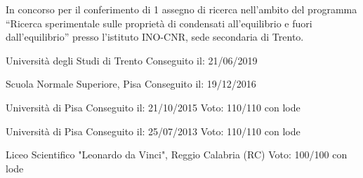 \documentclass[helvetica,italian,logo,notitle,totpages,utf8]{europecv2013}
\begin{document}

\begin{europecv}



\ecvpersonalinfo[10pt]

{In concorso per il conferimento di 1 assegno di ricerca nell'ambito del programma “Ricerca sperimentale sulle proprietà di condensati all'equilibrio e fuori dall'equilibrio” presso l'istituto INO-CNR, sede secondaria di Trento.}


{Università degli Studi di Trento}%
{Conseguito il: 21/06/2019 \vspace{-1.5em}}%
{}%

{Scuola Normale Superiore, Pisa}%
{Conseguito il: 19/12/2016 \vspace{-1.5em}}%
{}%

{Università di Pisa}%
{Conseguito il: 21/10/2015 \vspace{-1.5em}}%
{Voto: 110/110 con lode}%

{Università di Pisa}%
{Conseguito il: 25/07/2013 \vspace{-1.5em}}%
{Voto: 110/110 con lode}%

{Liceo Scientifico "Leonardo da Vinci", Reggio Calabria (RC)}%
{}%
{Voto: 100/100 con lode}%





\end{europecv}
\end{document}
